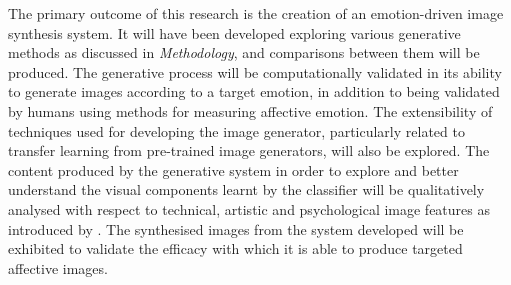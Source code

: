 \documentclass{article}
\begin{document}
The primary outcome of this research is the creation of an emotion-driven image synthesis system.
It will have been developed exploring various generative methods as discussed in \textit{Methodology}, and comparisons between them will be produced.
The generative process will be computationally validated in its ability to generate images according to a target emotion, in addition to being validated by humans using methods for measuring affective emotion.
The extensibility of techniques used for developing the image generator, particularly related to transfer learning from pre-trained image generators, will also be explored.
The content produced by the generative system in order to explore and better understand the visual components learnt by the classifier will be qualitatively analysed with respect to technical, artistic and psychological image features as introduced by \citet{machajdik2010affective}.
The synthesised images from the system developed will be exhibited to validate the efficacy with which it is able to produce targeted affective images.



\end{document}
